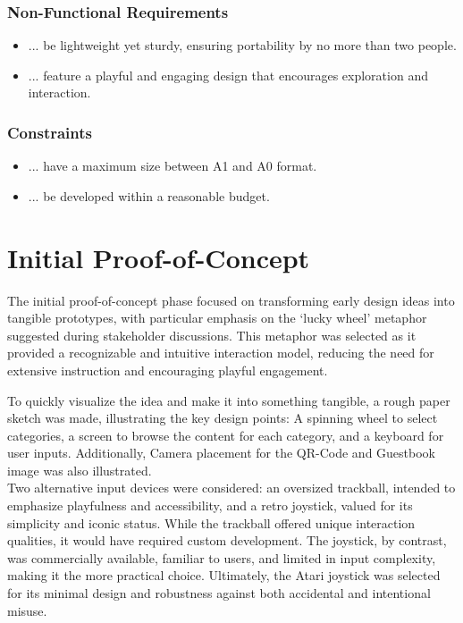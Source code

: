 \subsubsection{Non-Functional Requirements}
\begin{itemize}
	\item ... be lightweight yet sturdy, ensuring portability by no more than two people. 
	\item ... feature a playful and engaging design that encourages exploration and interaction. 
\end{itemize}

\subsubsection{Constraints}
\begin{itemize}
	\item ... have a maximum size between A1 and A0 format. 
	\item ... be developed within a reasonable budget. 
\end{itemize}


\section{Initial Proof-of-Concept}

The initial proof-of-concept phase focused on transforming early design ideas into tangible prototypes, with particular emphasis on the ‘lucky wheel’ metaphor suggested during stakeholder discussions. This metaphor was selected as it provided a recognizable and intuitive interaction model, reducing the need for extensive instruction and encouraging playful engagement.

To quickly visualize the idea and make it into something tangible, a rough paper sketch was made, illustrating the key design points: A spinning wheel to select categories, a screen to browse the content for each category, and a keyboard for user inputs. Additionally, Camera placement for the QR-Code and Guestbook image was also illustrated. \\

Two alternative input devices were considered: an oversized trackball, intended to emphasize playfulness and accessibility, and a retro joystick, valued for its simplicity and iconic status. While the trackball offered unique interaction qualities, it would have required custom development. The joystick, by contrast, was commercially available, familiar to users, and limited in input complexity, making it the more practical choice. Ultimately, the Atari joystick was selected for its minimal design and robustness against both accidental and intentional misuse.\\

